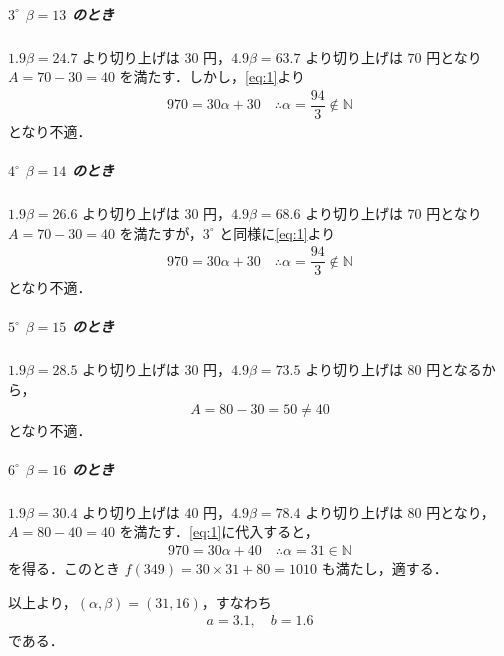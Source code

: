 \documentclass[../../main.tex]{subfiles}
\begin{document}
\subparagraph{$3^\circ$ $\beta = 13$ のとき}

$1.9\beta = 24.7$ より切り上げは $30$ 円，$4.9\beta = 63.7$ より切り上げは $70$ 円となり $A = 70 - 30 = 40$ を満たす．しかし，\cref{eq:1}より
\begin{align}
  970 = 30\alpha + 30 \quad \therefore \alpha = \dfrac{94}{3} \notin \mathbb{N}
\end{align}
となり不適．

\subparagraph{$4^\circ$ $\beta = 14$ のとき}

$1.9\beta = 26.6$ より切り上げは $30$ 円，$4.9\beta = 68.6$ より切り上げは $70$ 円となり $A = 70 - 30 = 40$ を満たすが，$3^\circ$ と同様に\cref{eq:1}より
\begin{align}
  970 = 30\alpha + 30 \quad \therefore \alpha = \dfrac{94}{3} \notin \mathbb{N}
\end{align}
となり不適．

\subparagraph{$5^\circ$ $\beta = 15$ のとき}

$1.9\beta = 28.5$ より切り上げは $30$ 円，$4.9\beta = 73.5$ より切り上げは $80$ 円となるから，
\begin{align}
  A = 80 - 30 = 50 \ne 40
\end{align}
となり不適．

\subparagraph{$6^\circ$ $\beta = 16$ のとき}
$1.9\beta = 30.4$ より切り上げは $40$ 円，$4.9\beta = 78.4$ より切り上げは $80$ 円となり，$A = 80 - 40 = 40$ を満たす．\cref{eq:1}に代入すると，
\begin{align}
  970 = 30\alpha + 40 \quad \therefore \alpha = 31 \in \mathbb{N}
\end{align}
を得る．このとき $f(349) = 30 \times 31 + 80 = 1010$ も満たし，適する．
\casesend

以上より，$(\alpha, \beta) = (31, 16)$，すなわち
\begin{align}
  a = 3.1, \quad b = 1.6 \tag{答}
\end{align}
である．

\newpage
\end{document}
